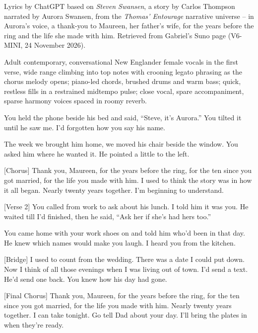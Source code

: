 \begin{notes}
Lyrics by ChatGPT based on \emph{Steven Swansen}, a story by Carlos Thompson narrated by Aurora Swansen, from the \emph{Thomas' Entourage} narrative universe -- in Aurora's voice, a thank-you to Maureen, her father's wife, for the years before the ring and the life she made with him. Retrieved from Gabriel's Suno page (V6-MINI, 24 November 2026).
\end{notes}
\begin{style}
Adult contemporary, conversational New Englander female vocals in the first verse, wide range climbing into top notes with crooning legato phrasing as the chorus melody opens; piano-led chords, brushed drums and warm bass; quick, restless fills in a restrained midtempo pulse; close vocal, spare accompaniment, sparse harmony voices spaced in roomy reverb.
\end{style}
\begin{lyrics}
[Verse 1]
You held the phone beside his bed
and said, “Steve, it’s Aurora.”
You tilted it until he saw me.
I’d forgotten how you say his name.

The week we brought him home,
we moved his chair beside the window.
You asked him where he wanted it.
He pointed a little to the left.

[Chorus]
Thank you, Maureen,
for the years before the ring,
for the ten since you got married,
for the life you made with him.
I used to think the story
was in how it all began.
Nearly twenty years together.
I’m beginning to understand.

[Verse 2]
You called from work to ask about his lunch.
I told him it was you.
He waited till I’d finished, then he said,
“Ask her if she’s had hers too.”

You came home with your work shoes on
and told him who’d been in that day.
He knew which names would make you laugh.
I heard you from the kitchen.

[Bridge]
I used to count from the wedding.
There was a date I could put down.
Now I think of all those evenings
when I was living out of town.
I’d send a text. He’d send one back.
You knew how his day had gone.

[Final Chorus]
Thank you, Maureen,
for the years before the ring,
for the ten since you got married,
for the life you made with him.
Nearly twenty years together.
I can take tonight.
Go tell Dad about your day.
I’ll bring the plates in when they’re ready.
\end{lyrics}

